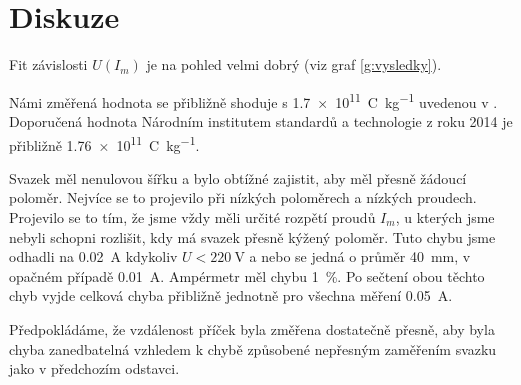 \section*{Diskuze}
Fit závislosti $U(I_m)$ je na pohled velmi dobrý (viz graf \ref{g:vysledky}).

Námi změřená hodnota se přibližně shoduje s \SI{1.7e11}{\coulomb\per\kg} uvedenou v \cite{skripta}. Doporučená hodnota Národním institutem standardů a technologie z roku 2014 je přibližně \SI{1.76e11}{\coulomb\per\kg}.

Svazek měl nenulovou šířku a bylo obtížné zajistit, aby měl přesně žádoucí poloměr. Nejvíce se to projevilo při nízkých poloměrech a nízkých proudech. Projevilo se to tím, že jsme vždy měli určité rozpětí proudů $I_m$, u kterých jsme nebyli schopni rozlišit, kdy má svazek přesně kýžený poloměr. Tuto chybu jsme odhadli na \SI{0.02}{\ampere} kdykoliv $U<\SI{220}{\volt}$ a nebo se jedná o průměr \SI{40}{\mm}, v opačném případě \SI{0.01}{\ampere}. Ampérmetr měl chybu \SI{1}{\percent}. Po sečtení obou těchto chyb vyjde celková chyba přibližně jednotně pro všechna měření \SI{0.05}{\ampere}.   

Předpokládáme, že vzdálenost příček byla změřena dostatečně přesně, aby byla chyba zanedbatelná vzhledem k chybě způsobené nepřesným zaměřením svazku jako v předchozím odstavci.